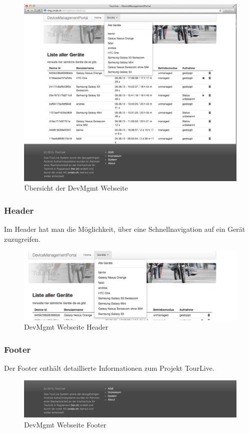 \begin{figure}[H]
	\centering
	\includegraphics[width=120mm]{images/devmgmtsrv/all.png}
	\caption{Übersicht der DevMgmt Webseite}
\end{figure}

\subsubsection{Header}
Im Header hat man die Möglichkeit, über eine Schnellnavigation auf ein Gerät zuzugreifen. 
\begin{figure}[H]
	\centering
	\includegraphics[width=120mm]{images/devmgmtsrv/header.png}
	\caption{DevMgmt Webseite Header}
\end{figure}



\subsubsection{Footer}
Der Footer enthält detaillierte Informationen zum Projekt TourLive. 
 
\begin{figure}[H]
	\centering
	\includegraphics[width=120mm]{images/devmgmtsrv/footer.png}
	\caption{DevMgmt Webseite Footer}
\end{figure}


